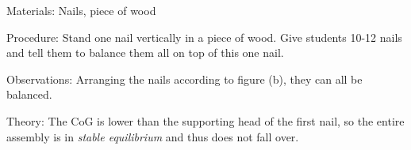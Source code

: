 \begin{multicols}{2}
\begin{description*}
\item[Materials:]{Nails, piece of wood}
\item[Procedure:]{Stand one nail vertically in a piece of wood. Give students 10-12 nails and tell them to balance them all on top of this one nail.}
\item[Observations:]{Arranging the nails according to figure (b), they can all be balanced.}
\item[Theory:]{The CoG is lower than the supporting head of the first nail, so the entire assembly is in \emph{stable equilibrium} and thus does not fall over.}
\end{description*}


\end{multicols}

\pagebreak